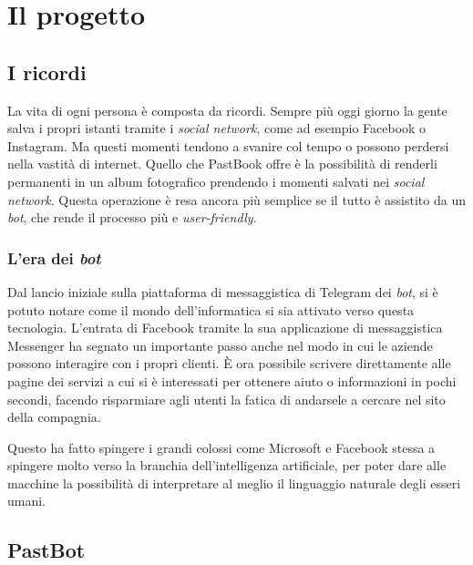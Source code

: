 
\chapter{Il progetto}
\label{cap:progetto}

\section{I ricordi}

La vita di ogni persona è composta da ricordi. Sempre più oggi giorno la gente
salva i propri istanti tramite i \textit{social network}, come ad esempio
Facebook o Instagram. Ma questi momenti tendono a svanire col tempo o possono
perdersi nella vastità di internet. Quello che PastBook offre è la
possibilità di renderli permanenti in un album fotografico prendendo i momenti
salvati nei \textit{social network}. Questa operazione è resa ancora più
semplice se il tutto è assistito da un \textit{bot}, che rende il processo più e
\textit{user-friendly}.

\subsection{L'era dei \textit{bot}}

Dal lancio iniziale sulla piattaforma di messaggistica di Telegram dei
\textit{bot}, si
è potuto notare come il mondo dell'informatica si sia attivato verso questa
tecnologia. L'entrata di Facebook tramite la sua applicazione di messaggistica
Messenger ha segnato un importante passo anche nel modo in cui le aziende
possono interagire con i propri clienti. È ora possibile scrivere direttamente
alle pagine dei servizi a cui si è interessati per ottenere aiuto o
informazioni in pochi secondi, facendo risparmiare agli utenti la fatica di
andarsele a cercare nel sito della compagnia.

Questo ha fatto spingere i grandi colossi come Microsoft e Facebook stessa a
spingere molto verso la branchia dell'intelligenza artificiale, per poter dare
alle macchine la possibilità di interpretare al meglio il linguaggio naturale
degli esseri umani.

\section{PastBot}

